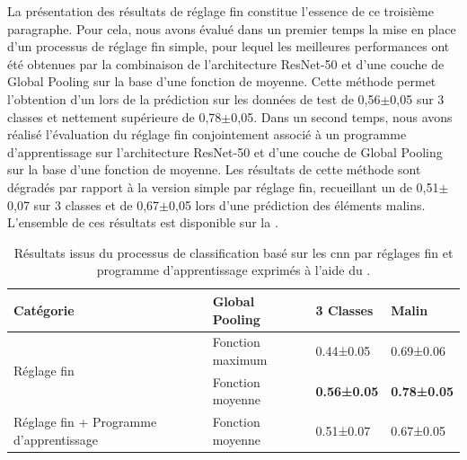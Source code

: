 La présentation des résultats de réglage fin constitue l'essence de ce troisième paragraphe. Pour cela, nous avons évalué dans un premier temps la mise en place d'un processus de réglage fin simple, pour lequel les meilleures performances ont été obtenues par la combinaison de l'architecture ResNet-50 et d'une couche de Global Pooling sur la base d'une fonction de moyenne. Cette méthode permet l'obtention d'un \fscore lors de la prédiction sur les données de test de 0,56$\pm$0,05 sur 3 classes et nettement supérieure de 0,78$\pm$0,05. Dans un second temps, nous avons réalisé l'évaluation du réglage fin conjointement associé à un programme d'apprentissage sur l'architecture ResNet-50 et d'une couche de Global Pooling sur la base d'une fonction de moyenne. Les résultats de cette méthode sont dégradés par rapport à la version simple par réglage fin, recueillant un \fscore de 0,51$\pm$0,07 sur 3 classes et de 0,67$\pm$0,05 lors d'une prédiction des éléments malins. L'ensemble de ces résultats est disponible sur la .\par

\begin{table}[H]
    \centering
    \begin{tabular}{llll}
        \toprule
        Catégorie                               & Global Pooling    & 3 Classes         & Malin             \\ \midrule
        \multirow{2}{*}{Réglage fin}            & Fonction maximum  & 0.44±0.05         & 0.69±0.06         \\
                                                & Fonction moyenne  & \textbf{0.56±0.05}& \textbf{0.78±0.05}\\ \midrule
        Réglage fin + Programme d'apprentissage & Fonction moyenne  & 0.51±0.07         & 0.67±0.05         \\
        \bottomrule
    \end{tabular}
    
    \caption{Résultats issus du processus de classification basé sur les \gls{cnn} par réglages fin et programme d'apprentissage exprimés à l'aide du \fscore.}
    \label{tab:parameters_image_improvement_fine}
\end{table}

